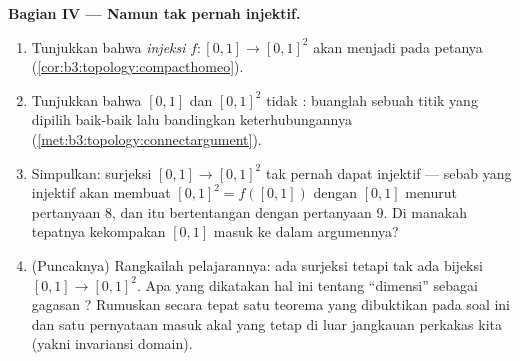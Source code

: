 \begin{problem}
\medskip
\noindent\textbf{Bagian IV --- Namun tak pernah injektif.}
\begin{enumerate}[resume]
  \item Tunjukkan bahwa \emph{injeksi}  $f \colon [0,1]
        \to [0,1]^2$ akan menjadi  pada petanya
        (\cref{cor:b3:topology:compacthomeo}).
  \item Tunjukkan bahwa $[0,1]$ dan $[0,1]^2$ tidak :
        buanglah sebuah titik yang dipilih baik-baik lalu bandingkan keterhubungannya
        (\cref{met:b3:topology:connectargument}).
  \item Simpulkan: surjeksi  $[0,1] \to [0,1]^2$
        tak pernah dapat injektif --- sebab yang injektif akan membuat
        $[0,1]^2 = f([0,1])$  dengan $[0,1]$ menurut
        pertanyaan 8, dan itu bertentangan dengan pertanyaan 9. Di manakah tepatnya
        kekompakan $[0,1]$ masuk ke dalam argumennya?
  \item (Puncaknya) Rangkailah pelajarannya: ada surjeksi
         tetapi tak ada bijeksi  $[0,1] \to
        [0,1]^2$. Apa yang dikatakan hal ini tentang ``dimensi'' sebagai gagasan
        ? Rumuskan secara tepat satu teorema yang
        dibuktikan pada soal ini dan satu pernyataan masuk akal yang
        tetap di luar jangkauan perkakas kita (yakni invariansi domain).
\end{enumerate}


\end{problem}
